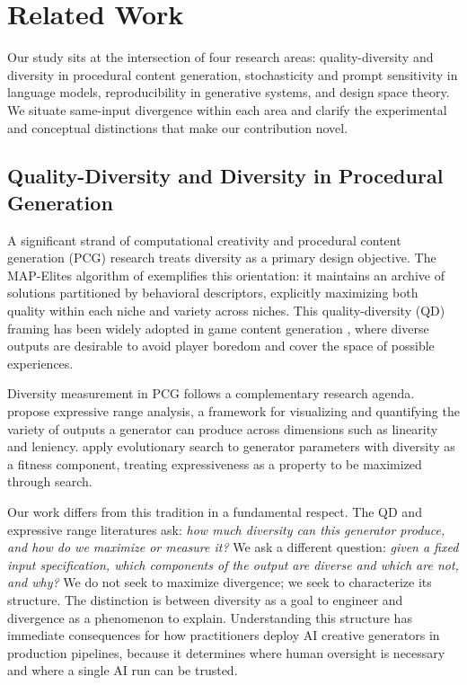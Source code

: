 \section{Related Work}

Our study sits at the intersection of four research areas: quality-diversity and diversity in procedural content generation, stochasticity and prompt sensitivity in language models, reproducibility in generative systems, and design space theory. We situate same-input divergence within each area and clarify the experimental and conceptual distinctions that make our contribution novel.

\subsection{Quality-Diversity and Diversity in Procedural Generation}

A significant strand of computational creativity and procedural content generation (PCG) research treats diversity as a primary design objective. The MAP-Elites algorithm of \citet{mouret2015illuminating} exemplifies this orientation: it maintains an archive of solutions partitioned by behavioral descriptors, explicitly maximizing both quality within each niche and variety across niches. This quality-diversity (QD) framing has been widely adopted in game content generation \cite{gravina2019quality}, where diverse outputs are desirable to avoid player boredom and cover the space of possible experiences.

Diversity measurement in PCG follows a complementary research agenda. \citet{smith2010analyzing} propose expressive range analysis, a framework for visualizing and quantifying the variety of outputs a generator can produce across dimensions such as linearity and leniency. \citet{shaker2014evolving} apply evolutionary search to generator parameters with diversity as a fitness component, treating expressiveness as a property to be maximized through search.

Our work differs from this tradition in a fundamental respect. The QD and expressive range literatures ask: \textit{how much diversity can this generator produce, and how do we maximize or measure it?} We ask a different question: \textit{given a fixed input specification, which components of the output are diverse and which are not, and why?} We do not seek to maximize divergence; we seek to characterize its structure. The distinction is between diversity as a goal to engineer and divergence as a phenomenon to explain. Understanding this structure has immediate consequences for how practitioners deploy AI creative generators in production pipelines, because it determines where human oversight is necessary and where a single AI run can be trusted.


